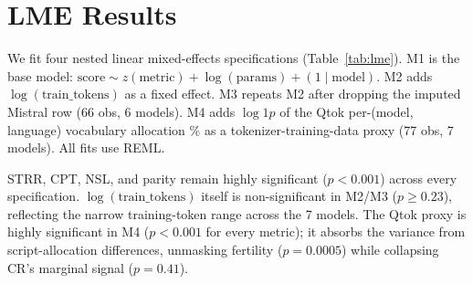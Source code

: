 \documentclass[11pt]{article}
\begin{document}
\section{LME Results}
\label{app:lme}

We fit four nested linear mixed-effects specifications (Table~\ref{tab:lme}). M1 is the base model: $\text{score} \sim z(\text{metric}) + \log(\text{params}) + (1 \mid \text{model})$. M2 adds $\log(\text{train\_tokens})$ as a fixed effect. M3 repeats M2 after dropping the imputed Mistral row (66 obs, 6 models). M4 adds $\log1p$ of the Qtok per-(model, language) vocabulary allocation \% as a tokenizer-training-data proxy (77 obs, 7 models). All fits use REML.

STRR, CPT, NSL, and parity remain highly significant ($p < 0.001$) across every specification. $\log(\text{train\_tokens})$ itself is non-significant in M2/M3 ($p \geq 0.23$), reflecting the narrow training-token range across the 7 models. The Qtok proxy is highly significant in M4 ($p < 0.001$ for every metric); it absorbs the variance from script-allocation differences, unmasking fertility ($p = 0.0005$) while collapsing CR's marginal signal ($p = 0.41$).

\begin{table}[H]
\centering
\small
\setlength{\tabcolsep}{2pt}
\caption{Linear mixed-effects model results across four specifications.}
\label{tab:lme}
\end{table}
\end{document}
